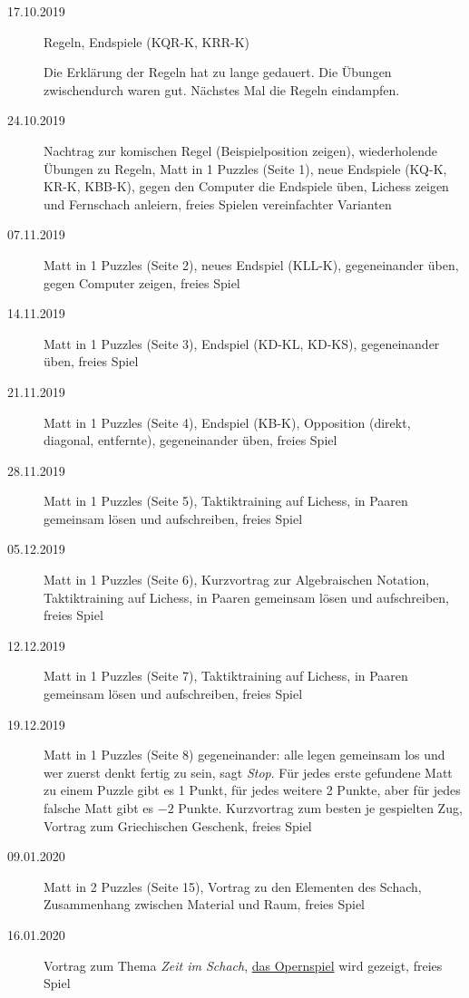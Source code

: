 \documentclass[
  a4paper,
  justified,
  nobib,
]{tufte-handout}
\begin{document}
\begin{description}
  \item[17.10.2019] Regeln, Endspiele (KQR-K, KRR-K)

    Die Erklärung der Regeln hat zu lange gedauert.
    Die Übungen zwischendurch waren gut.
    Nächstes Mal die Regeln eindampfen.

  \item[24.10.2019] Nachtrag zur komischen Regel (Beispielposition zeigen),
    wiederholende Übungen zu Regeln,
    Matt in 1 Puzzles (Seite 1),
    neue Endspiele (KQ-K, KR-K, KBB-K),
    gegen den Computer die Endspiele üben,
    Lichess zeigen und Fernschach anleiern,
    freies Spielen vereinfachter Varianten

  \item[07.11.2019] Matt in 1 Puzzles (Seite 2),
    neues Endspiel (KLL-K),
    gegeneinander üben,
    gegen Computer zeigen,
    freies Spiel

  \item[14.11.2019] Matt in 1 Puzzles (Seite 3),
    Endspiel (KD-KL, KD-KS),
    gegeneinander üben,
    freies Spiel

  \item[21.11.2019] Matt in 1 Puzzles (Seite 4),
    Endspiel (KB-K),
    Opposition (direkt, diagonal, entfernte),
    gegeneinander üben,
    freies Spiel

  \item[28.11.2019] Matt in 1 Puzzles (Seite 5),
    Taktiktraining auf Lichess,
    in Paaren gemeinsam lösen und aufschreiben,
    freies Spiel

  \item[05.12.2019] Matt in 1 Puzzles (Seite 6),
    Kurzvortrag zur Algebraischen Notation,
    Taktiktraining auf Lichess,
    in Paaren gemeinsam lösen und aufschreiben,
    freies Spiel

  \item[12.12.2019] Matt in 1 Puzzles (Seite 7),
    Taktiktraining auf Lichess,
    in Paaren gemeinsam lösen und aufschreiben,
    freies Spiel

  \item[19.12.2019] Matt in 1 Puzzles (Seite 8) gegeneinander: alle legen gemeinsam los
    und wer zuerst denkt fertig zu sein, sagt \emph{Stop}. Für jedes erste gefundene Matt
    zu einem Puzzle gibt es 1 Punkt, für jedes weitere 2 Punkte, aber für jedes falsche
    Matt gibt es $-2$ Punkte.
    Kurzvortrag zum besten je gespielten Zug,
    Vortrag zum Griechischen Geschenk,
    freies Spiel

  \item[09.01.2020] Matt in 2 Puzzles (Seite 15),
    Vortrag zu den Elementen des Schach,
    Zusammenhang zwischen Material und Raum,
    freies Spiel

  \item[16.01.2020] Vortrag zum Thema \emph{Zeit im Schach},
    \hyperref[par:the_opera_game]{das Opernspiel} wird gezeigt,
    freies Spiel

\end{description}
\end{document}
